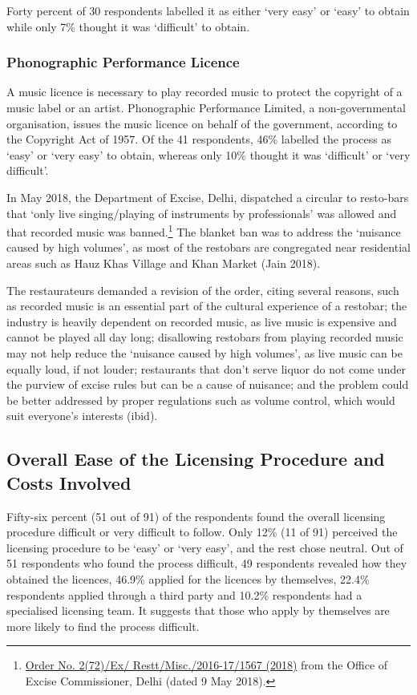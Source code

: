 \documentclass[a4paper, 12pt]{article}
\begin{document}
		Forty percent of 30 respondents labelled it as either ‘very easy’ or ‘easy’ to obtain while only 7\% thought it was ‘difficult’ to obtain. %
		
		
		\subsubsection{Phonographic Performance Licence}
		A music licence is necessary to play recorded music to protect the copyright of a music label or an artist. Phonographic Performance Limited, a non-governmental organisation, issues the music licence on behalf of the government, according to the 
Copyright Act of 1957. Of the 41 respondents, 46\% labelled the process as ‘easy’ or ‘very easy’ to obtain, whereas only 10\% thought it was ‘difficult’ or ‘very difficult’.
		
		In May 2018, the Department of Excise, Delhi, dispatched a circular to resto-bars that ‘only live singing/playing of instruments by professionals’ was allowed and that recorded music was banned.\footnote{\href{https://bit.ly/2MzCM02} {Order No. 2(72)/Ex/
Restt/Misc./2016-17/1567 (2018)} from the Office of Excise Commissioner, Delhi (dated 9 May 2018).} The blanket ban was to address the ‘nuisance caused by high volumes’, as most of the restobars are congregated near residential areas such as Hauz Khas 
Village and Khan Market (Jain 2018).
		
		The restaurateurs demanded a revision of the order, citing several reasons, such as recorded music is an essential part of the cultural experience of a restobar; the industry is heavily dependent on recorded music, as live music is expensive and cannot 
be played all day long; disallowing restobars from playing recorded music may not help reduce the ‘nuisance caused by high volumes’, as live music can be equally loud, if not louder; restaurants that don’t serve liquor do not come under the purview of excise rules 
but can be a cause of nuisance; and the problem could be better addressed by proper regulations such as volume control, which would suit everyone’s interests (ibid).
		
		
		
		\subsection{Overall Ease of the Licensing Procedure and Costs Involved}
		Fifty-six percent (51 out of 91) of the respondents found the overall licensing procedure difficult or very difficult to follow. Only 12\% (11 of 91) perceived the licensing procedure to be ‘easy’ or ‘very easy’, and the rest chose neutral. Out of 51 respondents 
who found the process difficult, 49 respondents revealed how they obtained the licences, 46.9\% applied for the licences by themselves, 22.4\% respondents applied through a third party and 10.2\% respondents had a specialised licensing team. It suggests that 
those who apply by themselves are more likely to find the process difficult.
		
\end{document}
